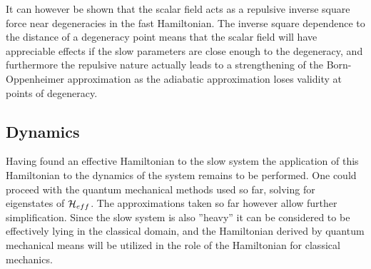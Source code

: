 \documentclass[a4paper]{article}
\begin{document}
It can however be shown that the scalar field acts as a repulsive inverse
square force near degeneracies in the fast Hamiltonian\cite{berrylim}. The inverse square dependence to
the distance of a degeneracy point means that the scalar field will have appreciable
effects if the slow parameters are close enough to the degeneracy, and furthermore the
repulsive nature actually leads to a strengthening of the Born-Oppenheimer approximation as
the adiabatic approximation loses validity at points of degeneracy.
\subsection{Dynamics}
Having found an effective Hamiltonian to the slow system the application of this
Hamiltonian to the dynamics of the system remains to be performed. One could proceed with
the quantum mechanical methods used so far, solving for eigenstates of \(\mathbb{\cal
H}_{eff}\). The approximations taken so far however allow further simplification. %
Since the slow system is also ''heavy'' it can be considered to be effectively lying in the classical domain,
and the Hamiltonian derived by quantum mechanical means will be utilized in the role of the
Hamiltonian for classical mechanics. %
\end{document}
